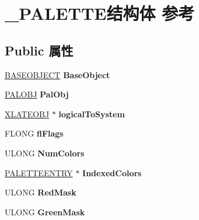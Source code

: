 \hypertarget{struct___p_a_l_e_t_t_e}{}\section{\+\_\+\+P\+A\+L\+E\+T\+T\+E结构体 参考}
\label{struct___p_a_l_e_t_t_e}
\subsection*{Public 属性}
\begin{DoxyCompactItemize}
\item 
\mbox{\label{struct___p_a_l_e_t_t_e_a1ea05489c74ad2101b534b236c05103e}} 
\hyperlink{class_b_a_s_e_o_b_j_e_c_t}{B\+A\+S\+E\+O\+B\+J\+E\+CT} {\bfseries Base\+Object}
\item 
\mbox{\label{struct___p_a_l_e_t_t_e_aeb875738f50d693417b82530795db36b}} 
\hyperlink{struct___p_a_l_o_b_j}{P\+A\+L\+O\+BJ} {\bfseries Pal\+Obj}
\item 
\mbox{\label{struct___p_a_l_e_t_t_e_a4cb31b9c657ea5016b6182ca5d79806b}} 
\hyperlink{struct___x_l_a_t_e_o_b_j}{X\+L\+A\+T\+E\+O\+BJ} $\ast$ {\bfseries logical\+To\+System}
\item 
\mbox{\label{struct___p_a_l_e_t_t_e_abea15eb322d685a83a08cd72431f46e5}} 
F\+L\+O\+NG {\bfseries fl\+Flags}
\item 
\mbox{\label{struct___p_a_l_e_t_t_e_a39b2c791fd9965e75017854d0b910ed6}} 
U\+L\+O\+NG {\bfseries Num\+Colors}
\item 
\mbox{\label{struct___p_a_l_e_t_t_e_a3d2b9aea670fc6a26bb70e37ea6f933b}} 
\hyperlink{structtag_p_a_l_e_t_t_e_e_n_t_r_y}{P\+A\+L\+E\+T\+T\+E\+E\+N\+T\+RY} $\ast$ {\bfseries Indexed\+Colors}
\item 
\mbox{\label{struct___p_a_l_e_t_t_e_ae3de8c84c9265f20ce7f86e7fd28866a}} 
U\+L\+O\+NG {\bfseries Red\+Mask}
\item 
\mbox{\label{struct___p_a_l_e_t_t_e_a1bbc2d3f029c2bd74b68bbae07595d10}} 
U\+L\+O\+NG {\bfseries Green\+Mask}

\end{DoxyCompactItemize}
